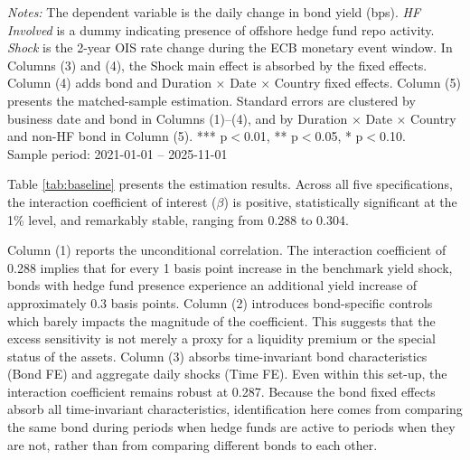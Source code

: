 \documentclass[english, 11pt, oneside]{article}
\begin{document}
\begin{table}[t]
\vspace{1ex}
\raggedright\scriptsize
\textit{Notes:} The dependent variable is the daily change in bond yield (bps). \textit{HF Involved} is a dummy indicating presence of offshore hedge fund repo activity. \textit{Shock} is the 2-year OIS rate change during the ECB monetary event window. In Columns (3) and (4), the Shock main effect is absorbed by the fixed effects. Column (4) adds bond and Duration $\times$ Date $\times$ Country fixed effects. Column (5) presents the matched-sample estimation. Standard errors are clustered by business date and bond in Columns (1)–(4), and by Duration $\times$ Date $\times$ Country and non-HF bond in Column (5). *** p$<$0.01, ** p$<$0.05, * p$<$0.10. \\ Sample period: 2021-01-01 -- 2025-11-01
\end{table}

Table \ref{tab:baseline} presents the estimation results. Across all five specifications, the interaction coefficient of interest ($\beta$) is positive, statistically significant at the 1\% level, and remarkably stable, ranging from 0.288 to 0.304.

Column (1) reports the unconditional correlation. The interaction coefficient of 0.288 implies that for every 1 basis point increase in the benchmark yield shock, bonds with hedge fund presence experience an additional yield increase of approximately 0.3 basis points. Column (2) introduces bond-specific controls which barely impacts the magnitude of the coefficient. This suggests that the excess sensitivity is not merely a proxy for a liquidity premium or the special status of the assets. Column (3) absorbs time-invariant bond characteristics (Bond FE) and aggregate daily shocks (Time FE). Even within this set-up, the interaction coefficient remains robust at 0.287. Because the bond fixed effects absorb all time-invariant characteristics, identification here comes from comparing the same bond during periods when hedge funds are active to periods when they are not, rather than from comparing different bonds to each other.
\end{document}
